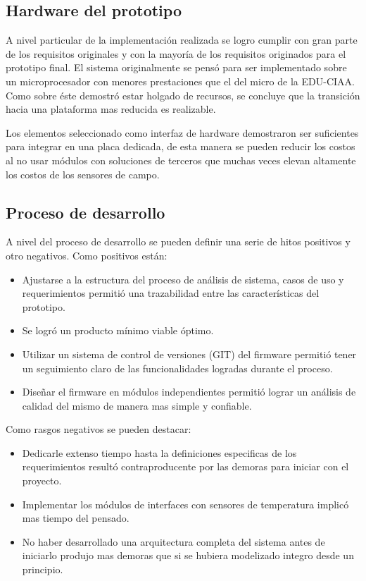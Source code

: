 \subsection{ Hardware del prototipo }
A nivel particular de la implementación realizada se logro cumplir con gran parte de los requisitos originales y con la mayoría de los requisitos originados para el prototipo final. 
El sistema originalmente se pensó para ser implementado sobre un microprocesador con menores prestaciones que el del micro de la EDU-CIAA. Como sobre éste demostró estar holgado de recursos, se concluye que la transición hacia una plataforma mas reducida es realizable.

Los elementos seleccionado como interfaz de hardware demostraron ser suficientes para integrar en una placa dedicada, de esta manera se pueden reducir los costos al no usar módulos con soluciones de terceros que muchas veces elevan altamente los costos de los sensores de campo.

\subsection{ Proceso de desarrollo }

A nivel del proceso de desarrollo se pueden definir una serie de hitos positivos y otro negativos. Como positivos están:
\begin{itemize}
\item Ajustarse a la estructura del proceso de análisis de sistema, casos de uso y requerimientos permitió una trazabilidad entre las características del prototipo.
\item Se logró un producto mínimo viable óptimo.
\item Utilizar un sistema de control de versiones (GIT) del firmware permitió tener un seguimiento claro de las funcionalidades logradas durante el proceso.
\item Diseñar el firmware en módulos independientes permitió lograr un análisis de calidad del mismo de manera mas simple y confiable.
\end{itemize}

Como rasgos negativos se pueden destacar:
\begin{itemize}
\item Dedicarle extenso tiempo hasta la definiciones especificas de los requerimientos resultó contraproducente por las demoras para iniciar con el proyecto.
\item Implementar los módulos de interfaces con sensores de temperatura implicó mas tiempo del pensado. 
\item No haber desarrollado una arquitectura completa del sistema antes de iniciarlo produjo mas demoras que si se hubiera modelizado integro desde un principio.
\end{itemize}


